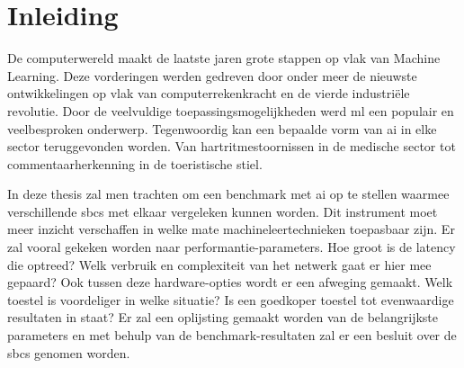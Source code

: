 \chapter{Inleiding}
De computerwereld maakt de laatste jaren grote stappen op vlak van Machine Learning\cite{Minar18}. Deze vorderingen werden gedreven door onder meer de nieuwste ontwikkelingen op vlak van computerrekenkracht en de vierde industri\"ele revolutie\cite{bloem2014fourth}. Door de veelvuldige toepassingsmogelijkheden werd \gls{ml} een populair en veelbesproken onderwerp. Tegenwoordig kan een bepaalde vorm van \gls{ai} in elke sector teruggevonden worden\cite{russell2016artificial}. Van hartritmestoornissen in de medische sector tot commentaarherkenning in de toeristische stiel. 

In deze thesis zal men trachten om een benchmark met \gls{ai} op te stellen waarmee verschillende \gls{sbc}s met elkaar vergeleken kunnen worden. Dit instrument moet meer inzicht verschaffen in welke mate machineleertechnieken toepasbaar zijn. Er zal vooral gekeken worden naar performantie-parameters. Hoe groot is de latency die optreed? Welk verbruik en complexiteit van het netwerk gaat er hier mee gepaard? Ook tussen deze hardware-opties wordt er een afweging gemaakt. Welk toestel is voordeliger in welke situatie? Is een goedkoper toestel tot evenwaardige resultaten in staat? Er zal een oplijsting gemaakt worden van de belangrijkste parameters en met behulp van de benchmark-resultaten zal er een besluit over de \gls{sbc}s genomen worden.

